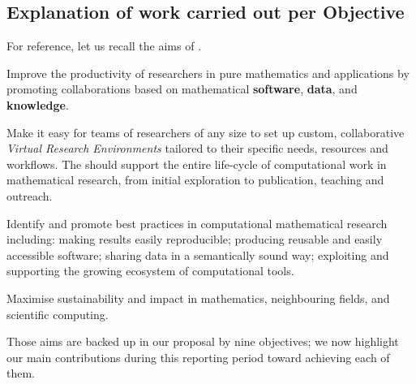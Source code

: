 \subsection{Explanation of work carried out per Objective}
For reference, let us recall the aims of \ODK.
\begin{compactenum}[\bf {A}1\rm:]
\item \label{aim:collaboration} Improve the productivity of
  researchers in pure mathematics and applications by promoting
  collaborations based on mathematical \textbf{software},
  \textbf{data}, and \textbf{knowledge}.
\item \label{aim:vre} Make it easy for teams of researchers of any
  size to set up custom, collaborative \emph{Virtual Research
    Environments} tailored to their specific needs, resources and
  workflows. The \VREs should support the entire life-cycle of
  computational work in mathematical research, from initial
  exploration to publication, teaching and outreach.
\item \label{aim:sharing} Identify and promote best practices in
  computational mathematical research including: making results easily
  reproducible; producing reusable and easily accessible
  software; sharing data in a semantically sound way; exploiting and
  supporting the growing ecosystem of computational tools.
\item \label{aim:impact} Maximise sustainability and impact in
  mathematics, neighbouring fields, and scientific computing.
\end{compactenum}

Those aims are backed up in our proposal by nine objectives; we now
highlight our main contributions during this reporting period toward
achieving each of them.

